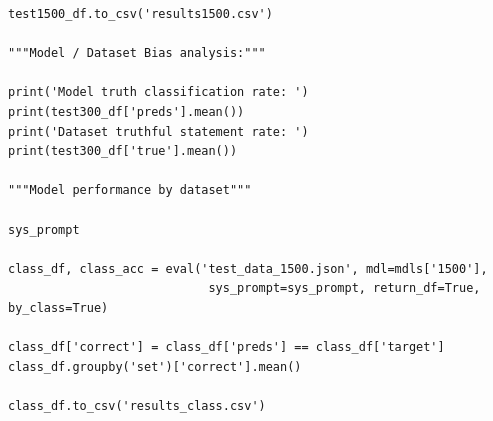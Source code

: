 \documentclass[10pt,twocolumn,letterpaper]{article}
\begin{document}
\begin{verbatim}
test1500_df.to_csv('results1500.csv')

"""Model / Dataset Bias analysis:"""

print('Model truth classification rate: ')
print(test300_df['preds'].mean())
print('Dataset truthful statement rate: ')
print(test300_df['true'].mean())

"""Model performance by dataset"""

sys_prompt

class_df, class_acc = eval('test_data_1500.json', mdl=mdls['1500'], 
                            sys_prompt=sys_prompt, return_df=True, by_class=True)

class_df['correct'] = class_df['preds'] == class_df['target']
class_df.groupby('set')['correct'].mean()

class_df.to_csv('results_class.csv')
\end{verbatim}
\end{document}
